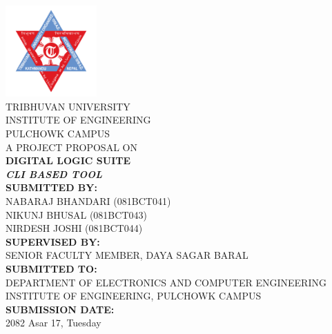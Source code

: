 \begin{titlepage}
    \begin{center}
        \includegraphics[width=3.5cm]{images/tuLogo.png} \\[0.8cm]

        {\large {TRIBHUVAN UNIVERSITY}} \\[0.2cm]
        {\normalsize {INSTITUTE OF ENGINEERING}} \\[0.2cm]
        {\normalsize {PULCHOWK CAMPUS}} \\[1cm]

        {\large {A PROJECT PROPOSAL ON}} \\[0.4cm]
        {\large \textbf{DIGITAL LOGIC SUITE}} \\[0.2cm]
        {\normalsize \textit{\textbf{CLI BASED TOOL}}} \\[1cm]

        {\normalsize \textbf{SUBMITTED BY:}} \\[0.2cm]
        {\normalsize NABARAJ BHANDARI (081BCT041)} \\[0.1cm]
        {\normalsize NIKUNJ BHUSAL (081BCT043)} \\[0.1cm]
        {\normalsize NIRDESH JOSHI (081BCT044)} \\[0.8cm]

        {\normalsize \textbf{SUPERVISED BY:}} \\[0.2cm]
        {\normalsize SENIOR FACULTY MEMBER, DAYA SAGAR BARAL} \\[0.8cm]

        {\normalsize \textbf{SUBMITTED TO:}} \\[0.2cm]
        {\normalsize DEPARTMENT OF ELECTRONICS AND COMPUTER ENGINEERING} \\[0.2cm]
        {\normalsize INSTITUTE OF ENGINEERING, PULCHOWK CAMPUS} \\[1cm]

        {\normalsize \textbf{SUBMISSION DATE:}} \\[0.2cm]
        {\normalsize 2082 Asar 17, Tuesday}
    \end{center}
\end{titlepage}